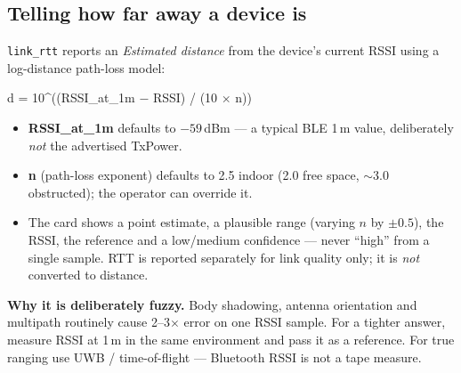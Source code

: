 \documentclass[11pt]{article}
\newif\ifintable\intablefalse
\newcommand{\code}[1]{\ifintable\texttt{#1}\else{\small\colorbox{codebg}{\texttt{#1}}}\fi}
\begin{document}
\subsection{Telling how far away a device is}
\code{link\_rtt} reports an \emph{Estimated distance} from the device's current
RSSI using a log-distance path-loss model:
\begin{codebox}\small\ttfamily d = 10\textasciicircum{}((RSSI\_at\_1m $-$ RSSI) / (10 $\times$ n))\end{codebox}
\begin{itemize}
  \item \textbf{RSSI\_at\_1m} defaults to $-59$\,dBm --- a typical BLE 1\,m value,
  deliberately \emph{not} the advertised TxPower.
  \item \textbf{n} (path-loss exponent) defaults to 2.5 indoor (2.0 free space,
  $\sim$3.0 obstructed); the operator can override it.
  \item The card shows a point estimate, a plausible range (varying $n$ by
  $\pm0.5$), the RSSI, the reference and a low/medium confidence --- never
  ``high'' from a single sample. RTT is reported separately for link quality
  only; it is \emph{not} converted to distance.
\end{itemize}
\begin{warnbox}
\textbf{Why it is deliberately fuzzy.} Body shadowing, antenna orientation and
multipath routinely cause 2--3$\times$ error on one RSSI sample. For a tighter
answer, measure RSSI at 1\,m in the same environment and pass it as a reference.
For true ranging use UWB / time-of-flight --- Bluetooth RSSI is not a tape measure.
\end{warnbox}
\end{document}
